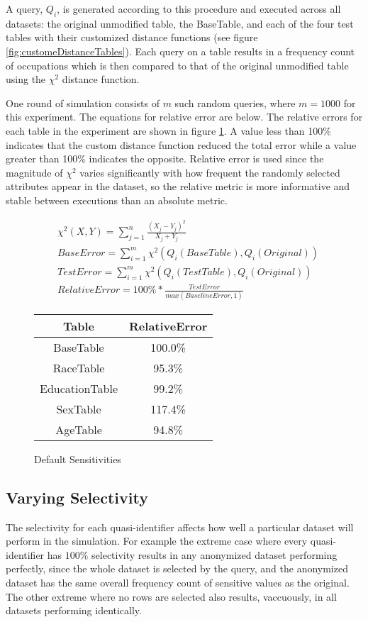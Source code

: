 A query, $Q_i$, is generated according to this procedure and executed across all datasets: the original unmodified table, the BaseTable, and each of the four test tables with their customized distance functions (see figure \ref{fig:customeDistanceTables}). Each query on a table results in a frequency count of occupations which is then compared to that of the original unmodified table using the $\chi^2$ distance function.

One round of simulation consists of $m$ such random queries, where $m=1000$ for this experiment. The equations for relative error are below. The relative errors for each table in the experiment are shown in figure \ref{fig:relativeErrorDefault}. A value less than 100\% indicates that the custom distance function reduced the total error while a value greater than 100\% indicates the opposite. Relative error is used since the magnitude of $\chi^2$ varies significantly with how frequent the randomly selected attributes appear in the dataset, so the relative metric is more informative and stable between executions than an absolute metric.

\begin{align*}
& \chi^2(X, Y) = \sum_{j=1}^{n} \frac{(X_j - Y_j)^2}{X_j + Y_j} \tag{1}\\
& BaseError = \sum_{i=1}^{m} \chi^2(Q_i(BaseTable), Q_i(Original)) \tag{2} \\
& TestError = \sum_{i=1}^{m} \chi^2(Q_i(TestTable), Q_i(Original)) \tag{3} \\
& RelativeError = 100\% * \frac{TestError}{max(BaselineError, 1)} \tag{4}
\end{align*}


\begin{figure}
\centering
\begin{tabular}{|c||c|}
\hline
Table & RelativeError \\
\hline
\hline
BaseTable & 100.0\% \\
\hline
RaceTable & 95.3\% \\
\hline
EducationTable & 99.2\% \\
\hline
SexTable & 117.4\% \\
\hline
AgeTable & 94.8\% \\
\hline
\end{tabular}
\caption{Default Sensitivities}
\label{fig:relativeErrorDefault}
\end{figure}

\subsection{Varying Selectivity}
The selectivity for each quasi-identifier affects how well a particular dataset will perform in the simulation. For example the extreme case where every quasi-identifier has $100\%$ selectivity results in any anonymized dataset performing perfectly, since the whole dataset is selected by the query, and the anonymized dataset has the same overall frequency count of sensitive values as the original. The other extreme where no rows are selected also results, vaccuously, in all datasets performing identically.

